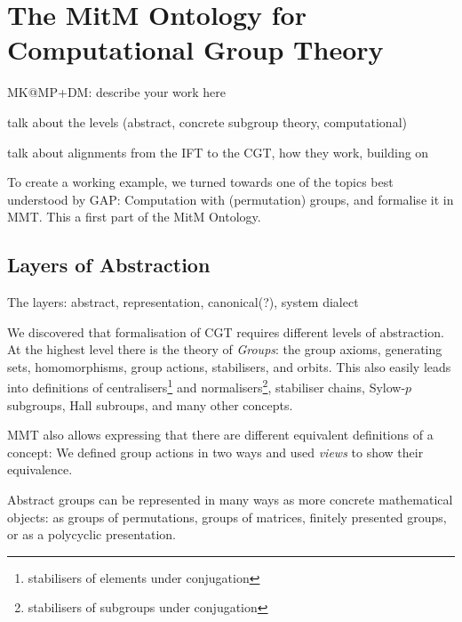 \section{The MitM Ontology for Computational Group Theory}\label{sec:cgt}
\begin{todolist}{MK@MP+DM: describe your work here}
\item talk about the levels (abstract, concrete subgroup theory, computational)
\item talk about alignments from the IFT to the CGT, how they work, building
  on~\cite{MueRoYuRa:abtafs17,MueGauKal:cacfms17} 
\end{todolist}

To create a working example, we turned towards one of the topics best
understood by GAP: Computation with (permutation) groups, and formalise it in
MMT.
This a first part of the MitM Ontology.


\subsection{Layers of Abstraction}
The layers: abstract, representation, canonical(?), system dialect

We discovered that formalisation of CGT requires different levels of
abstraction. At the highest level there is the theory of \emph{Groups}: the
group axioms, generating sets, homomorphisms, group actions, stabilisers,
and orbits. This also easily leads into definitions of
centralisers\footnote{stabilisers of elements under conjugation} and
normalisers\footnote{stabilisers of subgroups under
conjugation}, stabiliser chains,  Sylow-$p$ subgroups, Hall subroups, and many
other concepts. 

MMT also allows expressing that there are different equivalent definitions of a
concept: We defined group actions in two ways and used \emph{views} to show
their equivalence.


\medskip

Abstract groups can be represented in many ways as more concrete mathematical
objects: as groups of permutations, groups of matrices, finitely presented
groups, or as a polycyclic presentation.

